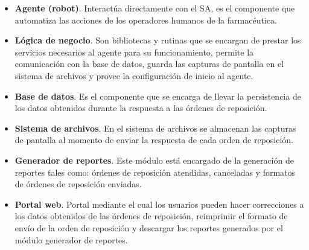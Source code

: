\documentclass[letterpaper,11pt]{article}
\begin{document}
\begin{itemize}
\item \textbf{Agente (robot)}. Interactúa directamente con el SA, es el componente que automatiza las acciones de los operadores humanos de la farmacéutica.
\item \textbf{Lógica de negocio}. Son bibliotecas y rutinas que se encargan de prestar los servicios necesarios al agente para su funcionamiento, permite la comunicación con la base de datos, guarda las capturas de pantalla en el sistema de archivos y provee la configuración de inicio al agente.
\item \textbf{Base de datos}. Es el componente que se encarga de llevar la persistencia de los datos obtenidos durante la respuesta a las órdenes de reposición.
\item \textbf{Sistema de archivos}. En el sistema de archivos se almacenan las capturas de pantalla al momento de enviar la respuesta de cada orden de reposición.
\item \textbf{Generador de reportes}. Este módulo está encargado de la generación de reportes tales como: órdenes de reposición atendidas, canceladas y formatos de órdenes de reposición enviadas.
\item \textbf{Portal web}. Portal mediante el cual los usuarios pueden hacer correcciones a los datos obtenidos de las órdenes de reposición, reimprimir el formato de envío de la orden de reposición  y descargar los reportes generados por el módulo generador de reportes.
\end{itemize}
\end{document}
